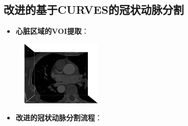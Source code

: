 \subsection[冠状动脉分割II]{改进的基于CURVES的冠状动脉分割}

\begin{frame}
\begin{itemize}
  \item \textbf{心脏区域的VOI提取}：
\end{itemize}
\begin{figure}[t]
\centering
\includegraphics[width=1.5in]{../../Figures/coronary/coronary_enhanced/original}
\end{figure}
\end{frame}

\begin{frame}
\begin{itemize}
  \item \textbf{改进的冠状动脉分割流程}：
\end{itemize}
\begin{figure}[t]
\centering

\end{figure}
\end{frame}

